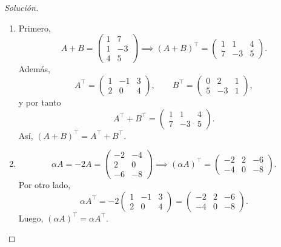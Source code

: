 \documentclass[a4,11pt]{aleph-notas}
\begin{document}
\begin{proof}[Soluci\'on]\hspace{0pt}
\begin{enumerate}
    \item Primero,
    \[
        A+B=
        \begin{pmatrix}1&7\\1&-3\\4&5\end{pmatrix}
        \implies
        (A+B)^\intercal=
        \begin{pmatrix}1&1&4\\7&-3&5\end{pmatrix}.
    \]
    Adem\'as,
    \[
        A^\intercal=\begin{pmatrix}1&-1&3\\2&0&4\end{pmatrix},
        \qquad
        B^\intercal=\begin{pmatrix}0&2&1\\5&-3&1\end{pmatrix},
    \]
    y por tanto
    \[
        A^\intercal+B^\intercal=
        \begin{pmatrix}1&1&4\\7&-3&5\end{pmatrix}.
    \]
    As\'i, $(A+B)^\intercal=A^\intercal+B^\intercal$.

    \item
    \[
        \alpha A=-2A=
        \begin{pmatrix}-2&-4\\2&0\\-6&-8\end{pmatrix}
        \implies
        (\alpha A)^\intercal=
        \begin{pmatrix}-2&2&-6\\-4&0&-8\end{pmatrix}.
    \]
    Por otro lado,
    \[
        \alpha A^\intercal=-2\begin{pmatrix}1&-1&3\\2&0&4\end{pmatrix}
        =\begin{pmatrix}-2&2&-6\\-4&0&-8\end{pmatrix}.
    \]
    Luego, $(\alpha A)^\intercal=\alpha A^\intercal$.
\end{enumerate}
\end{proof}
\end{document}
